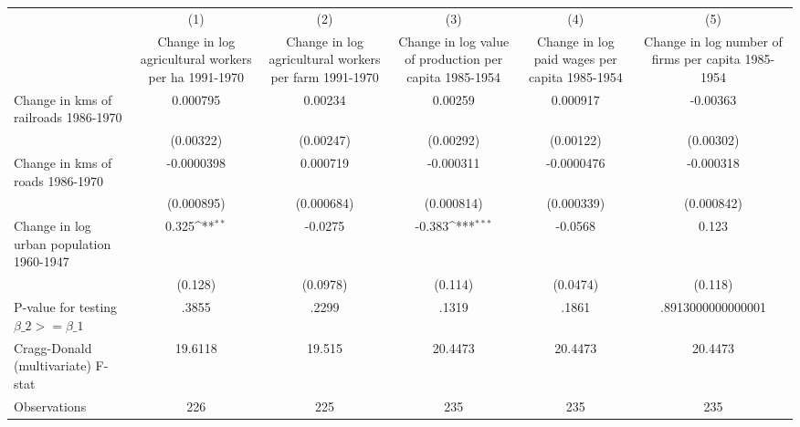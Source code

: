 {
\def\sym#1{\ifmmode^{#1}\else\(^{#1}\)\fi}
\begin{tabular}{l*{5}{c}}
\hline\hline
                &\multicolumn{1}{c}{(1)}&\multicolumn{1}{c}{(2)}&\multicolumn{1}{c}{(3)}&\multicolumn{1}{c}{(4)}&\multicolumn{1}{c}{(5)}\\
                &\multicolumn{1}{c}{Change in log agricultural workers per ha 1991-1970}&\multicolumn{1}{c}{Change in log agricultural workers per farm 1991-1970}&\multicolumn{1}{c}{Change in log value of production per capita 1985-1954}&\multicolumn{1}{c}{Change in log paid wages per capita 1985-1954}&\multicolumn{1}{c}{Change in log number of firms per capita 1985-1954}\\
\hline
Change in kms of railroads 1986-1970& 0.000795         &  0.00234         &  0.00259         & 0.000917         & -0.00363         \\
                &(0.00322)         &(0.00247)         &(0.00292)         &(0.00122)         &(0.00302)         \\
[1em]
Change in kms of roads 1986-1970&-0.0000398         & 0.000719         &-0.000311         &-0.0000476         &-0.000318         \\
                &(0.000895)         &(0.000684)         &(0.000814)         &(0.000339)         &(0.000842)         \\
[1em]
Change in log urban population 1960-1947&    0.325\sym{**} &  -0.0275         &   -0.383\sym{***}&  -0.0568         &    0.123         \\
                &  (0.128)         & (0.0978)         &  (0.114)         & (0.0474)         &  (0.118)         \\
\hline
P-value for testing $\beta\_{2} >= \beta\_{1}$&    .3855         &    .2299         &    .1319         &    .1861         &.8913000000000001         \\
Cragg-Donald (multivariate) F-stat&  19.6118         &   19.515         &  20.4473         &  20.4473         &  20.4473         \\
Observations    &      226         &      225         &      235         &      235         &      235         \\
\hline\hline
\end{tabular}
}
